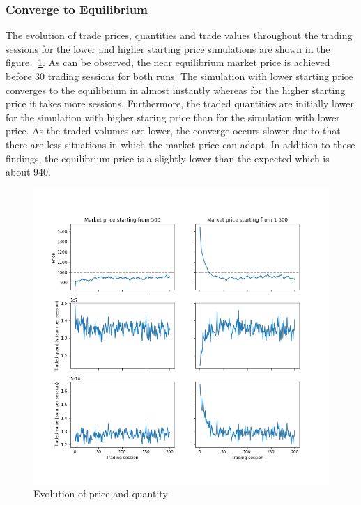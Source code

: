 

\subsubsection{Converge to Equilibrium}
The evolution of trade prices, quantities and trade values throughout
the trading sessions for the lower and higher starting price simulations 
are shown in the figure ~\ref{fig:basic_trades}. As can be observed,
the near equilibrium market price is achieved before 30 trading
sessions for both runs. The simulation with lower starting price converges
to the equilibrium in almost instantly whereas for the higher starting
price it takes more sessions. Furthermore, the traded quantities are
initially lower for the simulation with higher staring price than 
for the simulation with lower price. As the traded volumes are lower,
the converge occurs slower due to that there are less situations in
which the market price can adapt. In addition to these findings, 
the equilibrium price is a slightly lower than the expected which is 
about 940.

\begin{figure}
    \includegraphics[width=\linewidth]{plots/basic_trades.png}
    \caption{Evolution of price and quantity} %
    \label{fig:basic_trades}
\end{figure}

